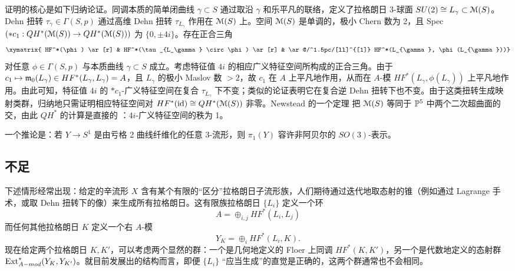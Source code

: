 证明的核心是如下归纳论证。同调本质的简单闭曲线 $\gamma \subset S$ 通过取沿 $\gamma$ 和乐平凡的联络，定义了拉格朗日 3-球面 $SU(2) \cong L_\gamma \subset \scrM(S)$。Dehn 扭转 $\tau_\gamma \in \Gamma(S,p)$ 通过高维 Dehn 扭转 $\tau_{L_{\gamma}}$ 作用在 $\scrM(S)$ 上。空间 $\scrM(S)$ 是单调的，极小 Chern 数为 2，且 Spec$(\ast c_1: QH^*(\scrM(S)) \rightarrow QH^*(\scrM(S)))$ 为 $\{0, \pm 4i\}$。存在正合三角
\begin{equation} \label{Eqn:InductiveTriangle}
\xymatrix{ HF^*(\phi) \ar[r] & HF^*(\tau_{L_\gamma} \circ \phi)  \ar[r] & \ar@/^1.5pc/[ll]^{[1]} HF^*(L_{\gamma}, \phi(L_{\gamma}))}
\end{equation}
对任意 $\phi \in \Gamma(S,p)$ 与本质曲线 $\gamma \subset S$ 成立。考虑特征值 $4i$ 的相应广义特征空间所构成的正合三角。由于 $c_1 \mapsto \frak{m}_0(L_{\gamma}) \in HF^*(L_{\gamma}, L_{\gamma}) = A$，且 $L_{\gamma}$ 的极小 Maslov 数 $>2$，故 $c_1$ 在 $A$ 上平凡地作用，从而在 $A$-模 $HF^*(L_{\gamma}, \phi(L_{\gamma}))$ 上平凡地作用。由此可知，特征值 $4i$ 的 $\ast c_1$-广义特征空间在复合 $\tau_{L_{\gamma}}$ 下不变；类似的论证表明它在复合逆 Dehn 扭转下也不变。由于这类扭转生成映射类群，归纳地只需证明相应特征空间对 $HF^*(\id)\cong QH^*(\scrM(S))$ 非零。Newstead 的一个定理 \cite{Newstead} 把 $\scrM(S)$ 等同于 $\bP^5$ 中两个二次超曲面的交，由此 $QH^*$ 的计算是直接的 \cite{SKD}：$4i$-广义特征空间的秩为 1。

一个推论是：若 $Y \rightarrow S^1$ 是由亏格 2 曲线纤维化的任意 3-流形，则 $\pi_1(Y)$ 容许非阿贝尔的 $SO(3)$-表示。

\subsection{不足}\label{Subsec:Shortcoming}

下述情形经常出现：给定的辛流形 $X$ 含有某个有限的“区分”拉格朗日子流形族，人们期待通过迭代地取态射的锥（例如通过 Lagrange 手术，或取 Dehn 扭转下的像）来生成所有拉格朗日。这有限族拉格朗日 $\{L_i\}$ 定义一个环
\[
A = \oplus_{i,j} HF^*(L_i, L_j)
\]
而任何其他拉格朗日 $K$ 定义一个右 $A$-模
\[
Y_K = \oplus_i HF^*(L_i, K).
\]
现在给定两个拉格朗日 $K, K'$，可以考虑两个显然的群：一个是几何地定义的 Floer 上同调 $HF^*(K,K')$，另一个是代数地定义的态射群 $\Ext_{A-mod}^*(Y_K, Y_{K'})$。就目前发展出的结构而言，即便 $\{L_i\}$ “应当生成”的直觉是正确的，这两个群通常也不会相同。

